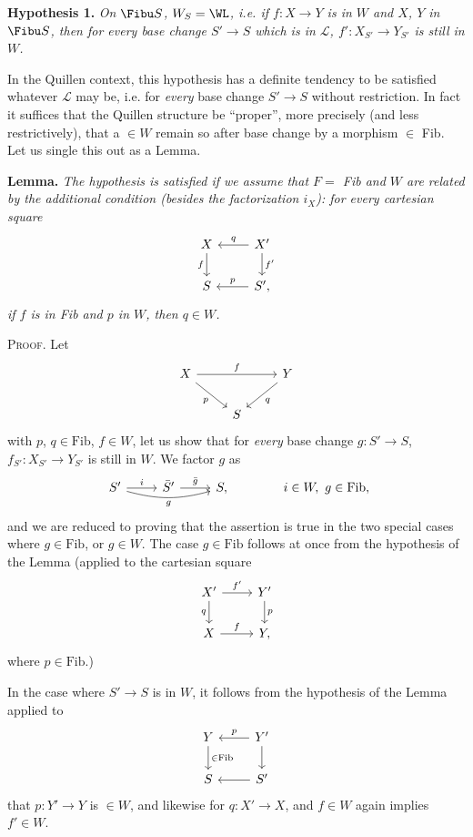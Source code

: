 \textbf{Hypothesis 1.} \textit{On $\Fibu S$, $W_S = \WL$, i.e. if $f : X \longrightarrow Y$ is in $W$ and $X$, $Y$ in $\Fibu S$, then for every base change $S' \longrightarrow S$ which is in $\mathcal{L}$, $f' : X_{S'} \longrightarrow Y_{S'}$ is still in $W$.}

In the Quillen context, this hypothesis has a definite tendency to be satisfied whatever $\mathcal{L}$ may be, i.e. for \textit{every} base change $S' \longrightarrow S$ without restriction. In fact it suffices that the Quillen structure be ``proper'', more precisely (and less restrictively), that a $\in W$ remain so after base change by a morphism $\in$ Fib. Let us single this out as a Lemma. %

\textbf{Lemma.} \textit{The hypothesis is satisfied if we assume}  \textit{that $F =$ Fib and $W$ are related by the additional condition (besides the factorization $i_X$): for every cartesian square}
\[
\begin{tikzcd}
X \arrow[d, "f"'] & X' \arrow[l, "q"'] \arrow[d, "f'"] \\
S & S', \arrow[l, "p"']
\end{tikzcd}
\]
\textit{if $f$ is in Fib and $p$ in $W$, then $q \in W$.}

\textsc{Proof}. Let
\[
\begin{tikzcd}
X \arrow[rr, "f"] \arrow[dr, "p"'] & & Y \arrow[dl, "q"] \\
& S &
\end{tikzcd}
\]
with $p$, $q \in \mathrm{Fib}$, $f \in W$, let us show that for \textit{every} base change $g : S' \longrightarrow S$, $f_{S'} : X_{S'} \longrightarrow Y_{S'}$ is still in $W$. We factor $g$ as
\[
\begin{tikzcd}
S' \arrow[r, "i"] \arrow[rr, bend right=15, "g"'] & \bar{S}' \arrow[r, "\bar{g}"] & S,
\end{tikzcd}
\qquad\qquad i \in W,\ g \in \mathrm{Fib},
\]
 and we are reduced to proving that the assertion is true in the two special cases where $g \in \mathrm{Fib}$, or $g \in W$. The case $g \in \mathrm{Fib}$ follows at once from the hypothesis of the Lemma (applied to the cartesian square
\[
\begin{tikzcd}
X' \arrow[r, "f'"] \arrow[d, "q"'] & Y' \arrow[d, "p"] \\
X \arrow[r, "f"] & Y,
\end{tikzcd}
\]
where $p \in \mathrm{Fib}$.)

In the case where $S' \longrightarrow S$ is in $W$, it follows from the hypothesis of the Lemma applied to
\[
\begin{tikzcd}
Y \arrow[d, "\in\mathrm{Fib}"] & Y' \arrow[l, "p"'] \arrow[d] \\
S & S' \arrow[l]
\end{tikzcd}
\]
that  $p : Y' \longrightarrow Y$ is $\in W$, and likewise for $q : X' \longrightarrow X$, and $f \in W$ again implies $f' \in W$.


